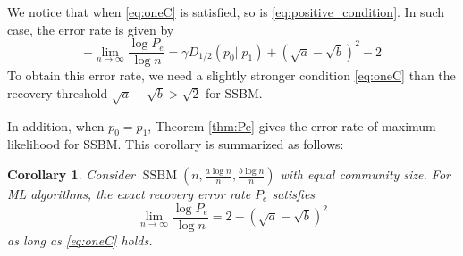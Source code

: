 \documentclass[conference,letterpaper]{IEEEtran}
\newtheorem{theorem}{Theorem}
\newtheorem{corollary}{Corollary}
\DeclareMathOperator{\SSBM}{SSBM}
\begin{document}
We notice that when \eqref{eq:oneC} is satisfied,
so is \eqref{eq:positive_condition}. In such case, the error
rate is given by
$$
-\lim_{n\to \infty} \frac{\log P_e}{\log n}
= \gamma D_{1/2}(p_0||p_1) + (\sqrt{a} - \sqrt{b})^2-2
$$
To obtain this error rate,
we need a slightly stronger condition \eqref{eq:oneC}
than the recovery threshold $\sqrt{a}-\sqrt{b} > \sqrt{2}$
for SSBM.

In addition, when $p_0=p_1$,
Theorem \ref{thm:Pe} gives the error rate of maximum likelihood for SSBM. This corollary is
summarized as follows:
\begin{corollary}\label{cor:sbm}
Consider $\SSBM(n,\frac{a\log n}{n}, \frac{b \log n}{n})$ with equal community size.
For ML algorithms, the exact recovery error rate $P_e$ satisfies
\begin{equation}\label{eq:cor}
\lim_{n\to \infty} \frac{\log P_e}{\log n} =2-(\sqrt{a} - \sqrt{b})^2
\end{equation}
as long as \eqref{eq:oneC} holds.
\end{corollary}
\end{document}
